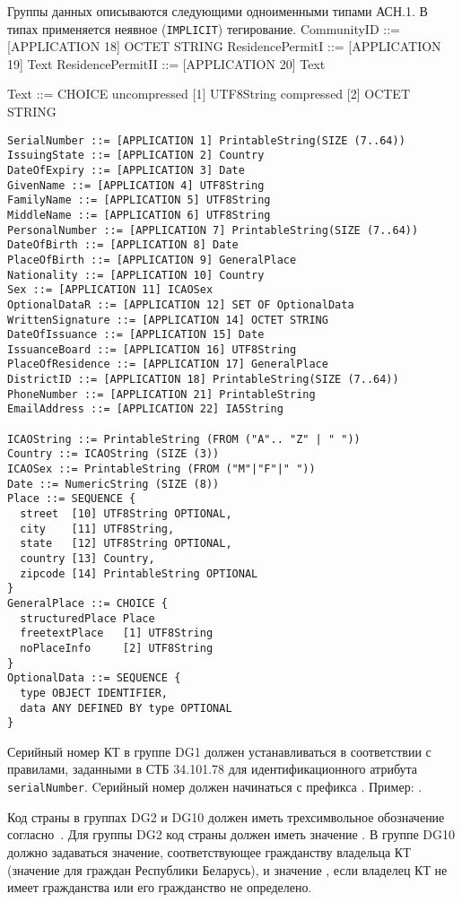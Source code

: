 Группы данных описываются следующими одноименными типами АСН.1.
В типах применяется неявное (\texttt{IMPLICIT}) тегирование.
CommunityID ::= [APPLICATION 18] OCTET STRING
ResidencePermitI ::= [APPLICATION 19] Text
ResidencePermitII ::= [APPLICATION 20] Text

Text ::= CHOICE {
  uncompressed [1] UTF8String
  compressed   [2] OCTET STRING
}
\fi
\begin{verbatim}
SerialNumber ::= [APPLICATION 1] PrintableString(SIZE (7..64))
IssuingState ::= [APPLICATION 2] Country
DateOfExpiry ::= [APPLICATION 3] Date
GivenName ::= [APPLICATION 4] UTF8String
FamilyName ::= [APPLICATION 5] UTF8String
MiddleName ::= [APPLICATION 6] UTF8String
PersonalNumber ::= [APPLICATION 7] PrintableString(SIZE (7..64))
DateOfBirth ::= [APPLICATION 8] Date
PlaceOfBirth ::= [APPLICATION 9] GeneralPlace
Nationality ::= [APPLICATION 10] Country
Sex ::= [APPLICATION 11] ICAOSex
OptionalDataR ::= [APPLICATION 12] SET OF OptionalData
WrittenSignature ::= [APPLICATION 14] OCTET STRING
DateOfIssuance ::= [APPLICATION 15] Date
IssuanceBoard ::= [APPLICATION 16] UTF8String
PlaceOfResidence ::= [APPLICATION 17] GeneralPlace
DistrictID ::= [APPLICATION 18] PrintableString(SIZE (7..64))
PhoneNumber ::= [APPLICATION 21] PrintableString
EmailAddress ::= [APPLICATION 22] IA5String

ICAOString ::= PrintableString (FROM ("A".. "Z" | " "))
Country ::= ICAOString (SIZE (3))
ICAOSex ::= PrintableString (FROM ("M"|"F"|" "))
Date ::= NumericString (SIZE (8))
Place ::= SEQUENCE {
  street  [10] UTF8String OPTIONAL,
  city    [11] UTF8String,
  state   [12] UTF8String OPTIONAL,
  country [13] Country,
  zipcode [14] PrintableString OPTIONAL
}
GeneralPlace ::= CHOICE {
  structuredPlace Place
  freetextPlace   [1] UTF8String
  noPlaceInfo     [2] UTF8String
}
OptionalData ::= SEQUENCE {
  type OBJECT IDENTIFIER,
  data ANY DEFINED BY type OPTIONAL
}
\end{verbatim}

Серийный номер КТ в группе DG1 должен устанавливаться в соответствии с правилами,
заданными в СТБ 34.101.78 для идентификационного атрибута \verb|serialNumber|. 
Cерийный номер должен начинаться с префикса .
Пример: .

Код страны в группах DG2 и DG10 должен иметь трехсимвольное обозначение 
согласно~\cite{CountryCodes}. 
Для группы DG2 код страны должен иметь значение .
В группе DG10 должно задаваться значение, соответствующее
гражданству владельца КТ (значение  для граждан Республики Беларусь), 
и значение , если владелец КТ не имеет гражданства 
или его гражданство не определено.

